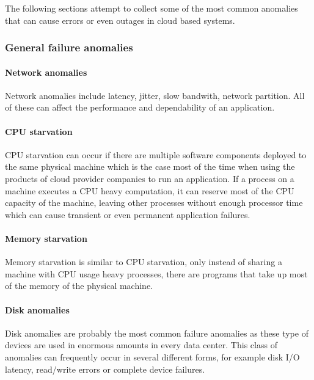 The following sections attempt to collect some of the most common anomalies that can cause errors or even outages in cloud based systems.

\subsubsection{General failure anomalies}

\paragraph{Network anomalies} Network anomalies include latency, jitter, slow bandwith, network partition. All of these can affect the performance and dependability of an application.

\paragraph{CPU starvation} CPU starvation can occur if there are multiple software components deployed to the same physical machine which is the case most of the time when using the products of cloud provider companies to run an application. If a process on a machine executes a CPU heavy computation, it can reserve most of the CPU capacity of the machine, leaving other processes without enough processor time which can cause transient or even permanent application failures.

\paragraph{Memory starvation} Memory starvation is similar to CPU starvation, only instead of sharing a machine with CPU usage heavy processes, there are programs that take up most of the memory of the physical machine.

\paragraph{Disk anomalies} Disk anomalies are probably the most common failure anomalies as these type of devices are used in enormous amounts in every data center. This class of anomalies can frequently occur in several different forms, for example disk I/O latency, read/write errors or complete device failures.

